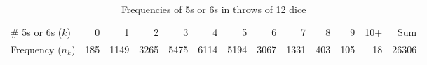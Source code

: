 \begin{table}[ht]
\centering
\caption{Frequencies of 5s or 6s in throws of 12 dice} \label{tab:dicetab}
\begin{tabular}{l|rrrrrrrrrrrr}
   \hline
\# 5s or 6s ($k$) & 0 & 1 & 2 & 3 & 4 & 5 & 6 & 7 & 8 & 9 & 10+ & Sum \\ 
Frequency ($n_k$) &   185 &  1149 &  3265 &  5475 &  6114 &  5194 &  3067 &  1331 &   403 &   105 &    18 & 26306 \\ 
   \hline
\end{tabular}
\end{table}

